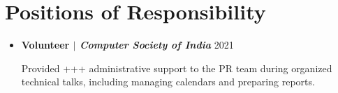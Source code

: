 \documentclass[letterpaper,5pt]{article}
\begin{document}
    \section{Positions of Responsibility}
    \begin{itemize}[leftmargin=0.15in, label={}]
        \item \textbf{Volunteer $|$ \emph{Computer Society of India}  }{2021}
        \begin{itemize}
            \textbullet{} Provided +++ administrative support to the PR team during organized technical talks, including managing calendars and preparing reports.
        \end{itemize}
    \end{itemize}
    
    
\end{document}
